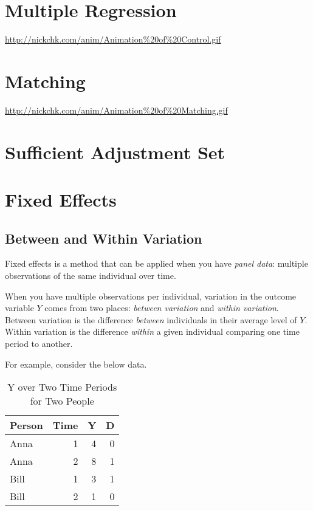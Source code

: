 \documentclass[]{book}
\theoremstyle{definition}
\theoremstyle{definition}
\theoremstyle{definition}
\theoremstyle{remark}
\begin{document}
\section{Multiple Regression}\label{multiple-regression}

\url{http://nickchk.com/anim/Animation%20of%20Control.gif}

\section{Matching}\label{matching}

\url{http://nickchk.com/anim/Animation%20of%20Matching.gif}

\section{Sufficient Adjustment Set}\label{sufficient-adjustment-set}

\section{Fixed Effects}\label{fixed-effects}

\subsection{Between and Within
Variation}\label{between-and-within-variation}

Fixed effects is a method that can be applied when you have \emph{panel
data}: multiple observations of the same individual over time.

When you have multiple observations per individual, variation in the
outcome variable \(Y\) comes from two places: \emph{between variation}
and \emph{within variation}. Between variation is the difference
\emph{between} individuals in their average level of \(Y\). Within
variation is the difference \emph{within} a given individual comparing
one time period to another.

For example, consider the below data.

\begin{table}[t]

\caption{\label{tab:unnamed-chunk-11}Y over Two Time Periods for Two People}
\centering
\begin{tabular}{l|r|r|r}
\hline
Person & Time & Y & D\\
\hline
Anna & 1 & 4 & 0\\
\hline
Anna & 2 & 8 & 1\\
\hline
Bill & 1 & 3 & 1\\
\hline
Bill & 2 & 1 & 0\\
\hline
\end{tabular}
\end{table}
\end{document}
